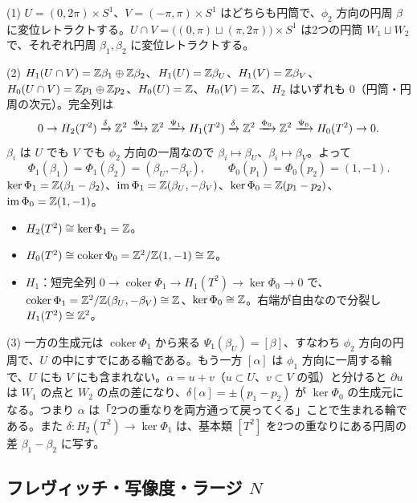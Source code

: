 \begin{solution}
(1) $U=(0,2\pi)\times S^1$、$V=(-\pi,\pi)\times S^1$ はどちらも円筒で、$\phi_2$ 方向の円周 $\beta$ に変位レトラクトする。$U\cap V=\bigl((0,\pi)\sqcup(\pi,2\pi)\bigr)\times S^1$ は2つの円筒 $W_1\sqcup W_2$ で、それぞれ円周 $\beta_1,\beta_2$ に変位レトラクトする。

(2) $H_1(U\cap V)=\mathbb{Z}\beta_1\oplus\mathbb{Z}\beta_2$、$H_1(U)=\mathbb{Z}\beta_U$、$H_1(V)=\mathbb{Z}\beta_V$、$H_0(U\cap V)=\mathbb{Z} p_1\oplus\mathbb{Z} p_2$、$H_0(U)=\mathbb{Z}$、$H_0(V)=\mathbb{Z}$、$H_2$ はいずれも $0$（円筒・円周の次元）。完全列は
\[
0\to H_2(T^2)\xrightarrow{\delta}\mathbb{Z}^2\xrightarrow{\Phi_1}\mathbb{Z}^2\xrightarrow{\Psi_1}H_1(T^2)\xrightarrow{\delta}\mathbb{Z}^2\xrightarrow{\Phi_0}\mathbb{Z}^2\xrightarrow{\Psi_0}H_0(T^2)\to0 .
\]
$\beta_i$ は $U$ でも $V$ でも $\phi_2$ 方向の一周なので $\beta_i\mapsto\beta_U$、$\beta_i\mapsto\beta_V$。よって
\[
\Phi_1(\beta_1)=\Phi_1(\beta_2)=(\beta_U,-\beta_V),\qquad\Phi_0(p_1)=\Phi_0(p_2)=(1,-1).
\]
$\ker\Phi_1=\mathbb{Z}(\beta_1-\beta_2)$、$\operatorname{im}\Phi_1=\mathbb{Z}(\beta_U,-\beta_V)$、$\ker\Phi_0=\mathbb{Z}(p_1-p_2)$、$\operatorname{im}\Phi_0=\mathbb{Z}(1,-1)$。
\begin{itemize}
\item $H_2(T^2)\cong\ker\Phi_1=\mathbb{Z}$。
\item $H_0(T^2)\cong\operatorname{coker}\Phi_0=\mathbb{Z}^2/\mathbb{Z}(1,-1)\cong\mathbb{Z}$。
\item $H_1$：短完全列 $0\to\operatorname{coker}\Phi_1\to H_1(T^2)\to\ker\Phi_0\to0$ で、$\operatorname{coker}\Phi_1=\mathbb{Z}^2/\mathbb{Z}(\beta_U,-\beta_V)\cong\mathbb{Z}$、$\ker\Phi_0\cong\mathbb{Z}$。右端が自由なので分裂し $H_1(T^2)\cong\mathbb{Z}^2$。
\end{itemize}

(3) 一方の生成元は $\operatorname{coker}\Phi_1$ から来る $\Psi_1(\beta_U)=[\beta]$、すなわち $\phi_2$ 方向の円周で、$U$ の中にすでにある輪である。もう一方 $[\alpha]$ は $\phi_1$ 方向に一周する輪で、$U$ にも $V$ にも含まれない。$\alpha=u+v$（$u\subset U$、$v\subset V$ の弧）と分けると $\partial u$ は $W_1$ の点と $W_2$ の点の差になり、$\delta[\alpha]=\pm(p_1-p_2)$ が $\ker\Phi_0$ の生成元になる。つまり $\alpha$ は「2つの重なりを両方通って戻ってくる」ことで生まれる輪である。また $\delta\colon H_2(T^2)\to\ker\Phi_1$ は、基本類 $[T^2]$ を2つの重なりにある円周の差 $\beta_1-\beta_2$ に写す。
\end{solution}

\subsection{フレヴィッチ・写像度・ラージ $N$}

